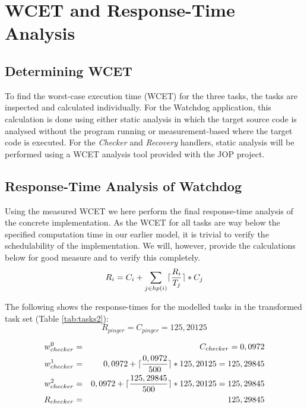 \chapter{WCET and Response-Time Analysis}
\label{chapter:wcetrta}
\section{Determining WCET} %
\label{sec:determining_wcet}
To find the worst-case execution time (WCET) for the three tasks, the tasks are inspected and calculated individually. For the Watchdog application, this calculation is done using either static analysis in which the target source code is analysed without the program running or measurement-based where the target code is executed. For the \textit{Checker} and \textit{Recovery} handlers, static analysis will be performed using a WCET analysis tool provided with the JOP project. 



\section{Response-Time Analysis of Watchdog} %
\label{sec:response_time_analysis_of_watchdog}
Using the measured WCET we here perform the final response-time analysis of the concrete implementation. As the WCET for all tasks are way below the specified computation time in our earlier model, it is trivial to verify the schedulability of the implementation. We will, however, provide the calculations below for good measure and to verify this completely.
\begin{equation}
\label{eq:rta}
     R_{i} = C_{i} + \sum\limits_{j\in hp(i)} \lceil\frac{R_{i}}{T_{j}}\rceil*C_{j}
\end{equation}

The following shows the response-times for the modelled tasks in the transformed task set (Table \ref{tab:tasks2}):
\begin{equation}
\label{eq:pingerrta}
     R_{pinger} = C_{pinger} = 125,20125
\end{equation}

\begin{eqnarray}
    w_{checker}^0 &=& C_{checker} = 0,0972 \nonumber \\ 
    w_{checker}^1 &=& 0,0972 + \lceil\frac{0,0972}{500}\rceil*125,20125 = 125,29845 \nonumber \\ 
    w_{checker}^2 &=& 0,0972 + \lceil\frac{125,29845}{500}\rceil*125,20125 = 125,29845 \nonumber \\
    R_{checker} &=& 125,29845
\end{eqnarray}

